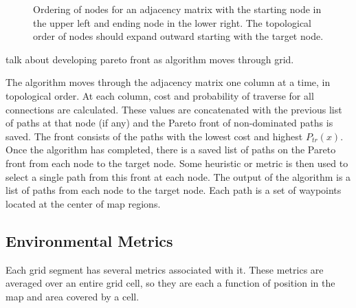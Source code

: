 \documentclass[journal]{IEEEtran}
\newcounter{row}
\newcounter{col}
\begin{document}
\begin{figure}[h]
\begin{center}

\newcommand\setrow[5]{
\setcounter{col}{1}
\foreach \n in {#1, #2, #3, #4, #5} {

	\edef\x{\value{col} - 0.5}
	\edef\y{5.5 - \value{row}}
	\node[anchor=center] at (\x, \y) {\n};
	\stepcounter{col}
	}
	\stepcounter{row}
}


\end{center}
\caption{Ordering of nodes for an adjacency matrix with the starting node in the upper left and ending node in the lower right. The topological order of nodes should expand outward starting with the target node. }
\end{figure}  

talk about developing pareto front as algorithm moves through grid.

The algorithm moves through the adjacency matrix one column at a time, in topological order. At each column, cost and probability of traverse for all connections are calculated. These values are concatenated with the previous list of paths at that node (if any) and the Pareto front of non-dominated paths is saved. 
The front consists of the paths with the lowest cost and highest $P_{tr}(x)$. 
Once the algorithm has completed, there is a saved list of paths on the Pareto front from each node to the target node.
Some heuristic or metric is then used to select a single path from this front at each node.
The output of the algorithm is a list of paths from each node to the target node. 
Each path is a set of waypoints located at the center of map regions. 

\subsection{Environmental Metrics}
Each grid segment has several metrics associated with it. These metrics are averaged over an entire grid cell, so they are each a function of position in the map and area covered by a cell.
\end{document}

